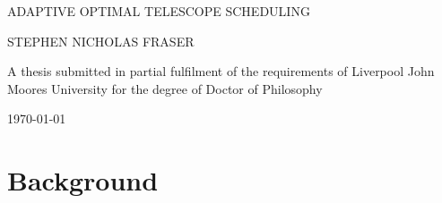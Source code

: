 \documentclass[12pt,a4paper]{article}
\newcommand{\HRule}{\rule{\linewidth}{0.5mm}}
\numberwithin{figure}{section}
\numberwithin{table}{section}
\numberwithin{algorithm}{section}
\begin{document}
\setlength{\parindent}{5mm}
\setlength{\parskip}{10pt plus2mm minus2mm}
\thispagestyle{empty}


\begin{titlepage}
\begin{center}


\Large{ADAPTIVE OPTIMAL TELESCOPE SCHEDULING}\\[1.5cm]

\vfill

\Large{STEPHEN NICHOLAS FRASER}

\vfill

 A thesis submitted in partial fulfilment of the requirements of 
            Liverpool John Moores University
                   for the degree of 
                Doctor of Philosophy

{\large \today}

\end{center}

\end{titlepage}






\newpage
\tableofcontents
\newpage
\listoffigures
\newpage
\listoftables
\newpage
\printglossary
\newpage
\printnotation
\newpage

\part{Background}









%
\end{document}
